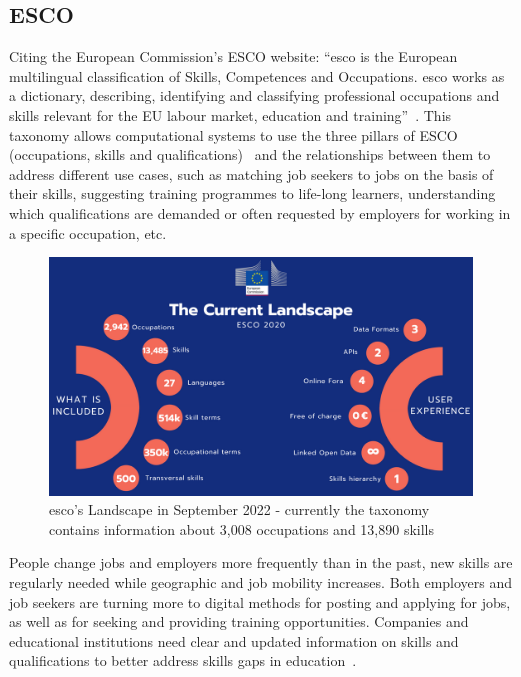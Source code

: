 \subsection{ESCO}
\label{sec:esco}
Citing the European Commission’s ESCO website: “\ac{esco} is the European multilingual classification of Skills, Competences and Occupations. \ac{esco} works as a dictionary, describing, identifying and classifying professional occupations and skills relevant for the EU labour market,  education and training”~\cite{what_esco}. This taxonomy allows computational systems to use the three pillars of ESCO (occupations, skills and qualifications)~\cite{Fareri_2021} and the relationships between them to address different use cases, such as matching job seekers to jobs on the basis of their skills, suggesting training programmes to life-long learners, understanding which qualifications are demanded or often requested by employers for working in a specific occupation, etc.

\begin{figure}[H]
    \centering
    \includegraphics[width=15cm]{figs/ESCO_Landscape.png}
    \caption{\acs{esco}'s Landscape in September 2022 - currently the taxonomy contains information about 3,008 occupations and 13,890 skills~\cite{what_esco}}
    \label{fig:esco_landscape}
\end{figure}

People change jobs and employers more frequently than in the past, new skills are regularly needed while geographic and job mobility increases. Both employers and job seekers are turning more to digital methods for posting and applying for jobs, as well as for seeking and providing training opportunities. Companies and educational institutions need clear and updated information on skills and qualifications to better address skills gaps in education~\cite{esco_needed}.  

